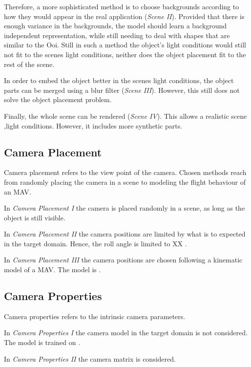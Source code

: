 Therefore, a more sophisticated method is to choose backgrounds according to how they would appear in the real application (\textit{Scene II}). Provided that there is enough variance in the backgrounds, the model should learn a background independent representation, while still needing to deal with shapes that are similar to the \ac{Ooi}. Still in such a method the object's light conditions would still not fit to the scenes light conditions, neither does the object placement fit to the rest of the scene.

In order to embed the object better in the scenes light conditions, the object parts can be merged using a blur filter (\textit{Scene III}). However, this still does not solve the object placement problem.

Finally, the whole scene can be rendered (\textit{Scene IV}). This allows a realistic scene ,light conditions. However, it includes more synthetic parts.


\subsection{Camera Placement}

Camera placement refers to the view point of the camera. Chosen methods reach from randomly placing the camera in a scene to modeling the flight behaviour of an \ac{MAV}.

In \textit{Camera Placement I} the camera is placed randomly in a scene, as long as the object is still visible.

In \textit{Camera Placement II} the camera positions are limited by what is to expected in the target domain. Hence, the roll angle is limited to XX .

In \textit{Camera Placement III} the camera positions are chosen following a kinematic model of a \ac{MAV}. The model is .



\subsection{Camera Properties}

Camera properties refers to the intrinsic camera parameters. 

In \textit{Camera Properties I} the camera model in the target domain is not considered. The model is trained on .

In \textit{Camera Properties II} the camera matrix is considered.

